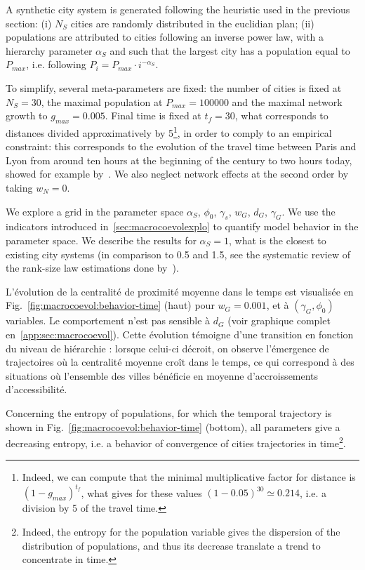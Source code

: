 A synthetic city system is generated following the heuristic used in the previous section: (i) $N_S$ cities are randomly distributed in the euclidian plan; (ii) populations are attributed to cities following an inverse power law, with a hierarchy parameter $\alpha_S$ and such that the largest city has a population equal to $P_{max}$, i.e. following $P_i = P_{max} \cdot i^{-\alpha_S}$.


To simplify, several meta-parameters are fixed: the number of cities is fixed at $N_S = 30$, the maximal population at $P_{max} = 100000$ and the maximal network growth to $g_{max} = 0.005$. Final time is fixed at $t_f = 30$, what corresponds to distances divided approximatively by 5\footnote{Indeed, we can compute that the minimal multiplicative factor for distance is $(1 - g_{max})^{t_f}$, what gives for these values $(1 - 0.05)^{30} \simeq 0.214$, i.e. a division by 5 of the travel time.}, in order to comply to an empirical constraint: this corresponds to the evolution of the travel time between Paris and Lyon from around ten hours at the beginning of the century to two hours today, showed for example by~\cite{thevenin2013mapping}. We also neglect network effects at the second order by taking $w_N = 0$.


We explore a grid in the parameter space $\alpha_S$, $\phi_0$, $\gamma_s$, $w_G$, $d_G$, $\gamma_G$. We use the indicators introduced in~\ref{sec:macrocoevolexplo} to quantify model behavior in the parameter space. We describe the results for $\alpha_S = 1$, what is the closest to existing city systems (in comparison to 0.5 and 1.5, see the systematic review of the rank-size law estimations done by~\cite{10.1371/journal.pone.0183919}).



L'évolution de la centralité de proximité moyenne dans le temps est visualisée en Fig.~\ref{fig:macrocoevol:behavior-time} (haut) pour $w_G = 0.001$, et à $(\gamma_G,\phi_0)$ variables. Le comportement n'est pas sensible à $d_G$ (voir graphique complet en~\ref{app:sec:macrocoevol}). Cette évolution témoigne d'une transition en fonction du niveau de hiérarchie : lorsque celui-ci décroit, on observe l'émergence de trajectoires où la centralité moyenne croît dans le temps, ce qui correspond à des situations où l'ensemble des villes bénéficie en moyenne d'accroissements d'accessibilité.


Concerning the entropy of populations, for which the temporal trajectory is shown in Fig.~\ref{fig:macrocoevol:behavior-time} (bottom), all parameters give a decreasing entropy, i.e. a behavior of convergence of cities trajectories in time\footnote{Indeed, the entropy for the population variable gives the dispersion of the distribution of populations, and thus its decrease translate a trend to concentrate in time.}.


